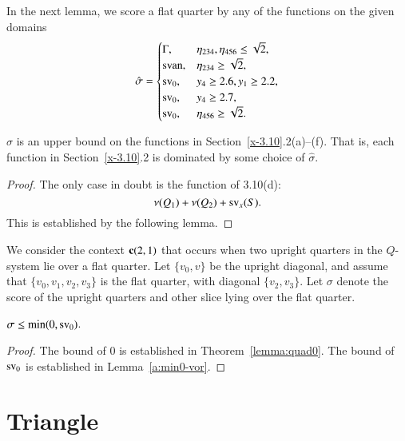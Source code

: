 In the next lemma, we score a flat quarter by any of the functions
on the given domains
     $$\hat\sigma=
        \begin{cases}
            \Gamma,& \eta_{234},\eta_{456}\le\sqrt2,\\
             {\operatorname{svan}}, &\eta_{234}\ge\sqrt2,\\
            {\operatorname{sv}}_0, & y_4\ge 2.6, y_1\ge2.2,\\
            {\operatorname{sv}}_0, & y_4\ge 2.7,\\
            {\operatorname{sv}}_0,& \eta_{456}\ge\sqrt2.
        \end{cases}
    $$

\begin{lemma}
    \label{lemma:hatsigma}
$\hat\sigma$ is an upper bound on the functions in
Section~\ref{x-3.10}.2(a)--(f). That is, each function in
Section~\ref{x-3.10}.2 is dominated by some choice of $\hat\sigma$.
\end{lemma}

\begin{proof}  The only case in doubt is the function of 3.10(d):
$$\nu(Q_1)+\nu(Q_2)+{\operatorname{sv}}_x(S).$$ This is established by the
following lemma.
\end{proof}


We consider the context ${\operatorname{\bf c}}{(2,1)}$ that occurs when two upright
quarters in the $Q$-system lie over a flat quarter. Let $\{v_0,v\}$ be
the upright diagonal, and assume that $\{v_0,v_1,v_2,v_3\}$ is the
flat quarter, with diagonal $\{v_2,v_3\}$. Let $\sigma$ denote the
score of the upright quarters and other slice lying
over the flat quarter.

\begin{lemma}\label{lemma:min0-svor}
    $\sigma\le \min(0,{\operatorname{sv}}_0)$.
\end{lemma}

\begin{proof}
The bound of $0$ is established in Theorem~\ref{lemma:quad0}.
The bound of ${\operatorname{sv}}_0$ is established in Lemma~\ref{a:min0-vor}.
\end{proof}





\section{Triangle}


